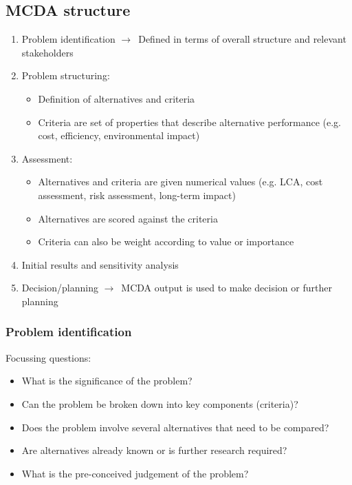 \documentclass{article}
\begin{document}
\subsection{MCDA structure}
\begin{enumerate}
    \item Problem identification $\to$\ Defined in terms of overall structure and relevant stakeholders
    \item Problem structuring:
    \begin{itemize}
        \item Definition of alternatives and criteria
        \item Criteria are set of properties that describe alternative performance (e.g. cost, efficiency, environmental impact)
    \end{itemize}
    \item Assessment:
    \begin{itemize}
        \item Alternatives and criteria are given numerical values (e.g. LCA, cost assessment, risk assessment, long-term impact)
        \item Alternatives are scored against the criteria
        \item Criteria can also be weight according to value or importance
    \end{itemize}
    \item Initial results and sensitivity analysis
    \item Decision/planning $\to$\ MCDA output is used to make decision or further planning
\end{enumerate}

\subsubsection{Problem identification}
Focussing questions:
\begin{itemize}
    \item What is the significance of the problem?
    \item Can the problem be broken down into key components (criteria)?
    \item Does the problem involve several alternatives that need to be compared?
    \item Are alternatives already known or is further research required?
    \item What is the pre-conceived judgement of the problem?
\end{itemize}
\end{document}

